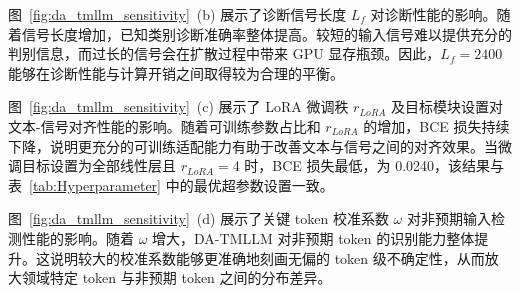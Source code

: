 图~\ref{fig:da_tmllm_sensitivity}~(b) 展示了诊断信号长度 $L_{f}$ 对诊断性能的影响。随着信号长度增加，已知类别诊断准确率整体提高。较短的输入信号难以提供充分的判别信息，而过长的信号会在扩散过程中带来 GPU 显存瓶颈。因此，$L_{f}=2400$ 能够在诊断性能与计算开销之间取得较为合理的平衡。

图~\ref{fig:da_tmllm_sensitivity}~(c) 展示了 LoRA 微调秩 $r_{LoRA}$ 及目标模块设置对文本-信号对齐性能的影响。随着可训练参数占比和 $r_{LoRA}$ 的增加，BCE 损失持续下降，说明更充分的可训练适配能力有助于改善文本与信号之间的对齐效果。当微调目标设置为全部线性层且 $r_{LoRA}=4$ 时，BCE 损失最低，为 0.0240，该结果与表~\ref{tab:Hyperparameter} 中的最优超参数设置一致。

图~\ref{fig:da_tmllm_sensitivity}~(d) 展示了关键 token 校准系数 $\omega$ 对非预期输入检测性能的影响。随着 $\omega$ 增大，DA-TMLLM 对非预期 token 的识别能力整体提升。这说明较大的校准系数能够更准确地刻画无偏的 token 级不确定性，从而放大领域特定 token 与非预期 token 之间的分布差异。

